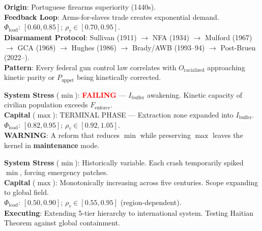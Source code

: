 \begin{tcolorbox}[colback=black!5, colframe=black!70, fonttitle=\bfseries\ttfamily, title=10. RUNTIME LOG: DISARMAMENT VARIABLE (FULL TIMELINE) \normalfont\small--- Chapter \ref{ch:kinetic}]
\ttfamily\small
\textbf{Origin}: Portuguese firearms superiority (1440s).\\
\textbf{Feedback Loop}: Arms-for-slaves trade creates exponential demand.\\
\textbf{$\Phi_{\text{load}}$}: $[0.60, 0.85]$; $\rho_{\tau} \in [0.70, 0.95]$.\\
\textbf{Disarmament Protocol}: Sullivan (1911) $\rightarrow$ NFA (1934) $\rightarrow$ Mulford (1967) $\rightarrow$ GCA (1968) $\rightarrow$ Hughes (1986) $\rightarrow$ Brady/AWB (1993--94) $\rightarrow$ Post-Bruen (2022--).\\
\textbf{Pattern}: Every federal gun control law correlates with $O_{\text{racialized}}$ approaching kinetic parity or $P_{\text{uppet}}$ being kinetically corrected.
\end{tcolorbox}

\begin{tcolorbox}[colback=black!5, colframe=black!70, fonttitle=\bfseries\ttfamily, title=11. RUNTIME LOG: PRESCRIPTIVE STRESS TEST \normalfont\small--- Chapter \ref{ch:contradiction}]
\ttfamily\small
\textbf{System Stress} ($\min$): \textcolor{red}{\textbf{FAILING}} --- $I_{\text{buffer}}$ awakening. Kinetic capacity of civilian population exceeds $F_{\text{enforce}}$.\\
\textbf{Capital} ($\max$): TERMINAL PHASE --- Extraction zone expanded into $I_{\text{buffer}}$.\\
\textbf{$\Phi_{\text{load}}$}: $[0.82, 0.95]$; $\rho_{\tau} \in [0.92, 1.05]$.\\
\textbf{WARNING}: A reform that reduces $\min$ while preserving $\max$ leaves the kernel in \textbf{maintenance} mode.
\end{tcolorbox}

\begin{tcolorbox}[colback=black!5, colframe=black!70, fonttitle=\bfseries\ttfamily, title=11. RUNTIME LOG: SCALING TO IMPERIAL ARCHITECTURE \normalfont\small--- Chapter \ref{ch:global}]
\ttfamily\small
\textbf{System Stress} ($\min$): Historically variable. Each crash temporarily spiked $\min$, forcing emergency patches.\\
\textbf{Capital} ($\max$): Monotonically increasing across five centuries. Scope expanding to global field.\\
\textbf{$\Phi_{\text{load}}$}: $[0.50, 0.90]$; $\rho_{\tau} \in [0.55, 0.95]$ (region-dependent).\\
\textbf{Executing}: Extending 5-tier hierarchy to international system. Testing Haitian Theorem against global containment.
\end{tcolorbox}

